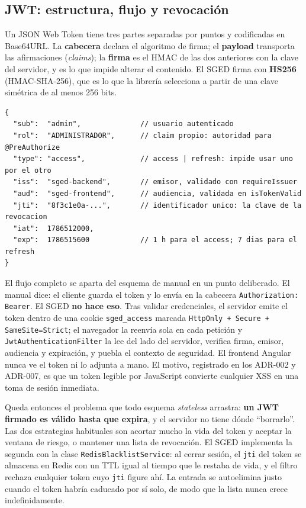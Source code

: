 \documentclass[12pt,a4paper]{article}
\begin{document}
\subsection{JWT: estructura, flujo y revocación}

Un JSON Web Token tiene tres partes separadas por puntos y codificadas en Base64URL. La
\textbf{cabecera} declara el algoritmo de firma; el \textbf{payload} transporta las
afirmaciones (\textit{claims}); la \textbf{firma} es el HMAC de las dos anteriores con la clave
del servidor, y es lo que impide alterar el contenido. El SGED firma con \textbf{HS256}
(HMAC-SHA-256), que es lo que la librería selecciona a partir de una clave simétrica de al menos
256 bits.

\begin{lstlisting}[style=json, caption={Payload real emitido por JwtService (valores de ejemplo)}]
{
  "sub":  "admin",              // usuario autenticado
  "rol":  "ADMINISTRADOR",      // claim propio: autoridad para @PreAuthorize
  "type": "access",             // access | refresh: impide usar uno por el otro
  "iss":  "sged-backend",       // emisor, validado con requireIssuer
  "aud":  "sged-frontend",      // audiencia, validada en isTokenValid
  "jti":  "8f3c1e0a-...",       // identificador unico: la clave de la revocacion
  "iat":  1786512000,
  "exp":  1786515600            // 1 h para el access; 7 dias para el refresh
}
\end{lstlisting}

El flujo completo se aparta del esquema de manual en un punto deliberado. El manual dice: el
cliente guarda el token y lo envía en la cabecera \texttt{Authorization: Bearer}. El SGED
\textbf{no hace eso}. Tras validar credenciales, el servidor emite el token dentro de una cookie
\texttt{sged\_access} marcada \texttt{HttpOnly + Secure + SameSite=Strict}; el navegador la
reenvía sola en cada petición y \texttt{JwtAuthenticationFilter} la lee del lado del servidor,
verifica firma, emisor, audiencia y expiración, y puebla el contexto de seguridad. El frontend
Angular nunca ve el token ni lo adjunta a mano. El motivo, registrado en los ADR-002 y ADR-007,
es que un token legible por JavaScript convierte cualquier XSS en una toma de sesión inmediata.

Queda entonces el problema que todo esquema \textit{stateless} arrastra: \textbf{un JWT firmado es
válido hasta que expira}, y el servidor no tiene dónde ``borrarlo''. Las dos estrategias
habituales son acortar mucho la vida del token y aceptar la ventana de riesgo, o mantener una
lista de revocación. El SGED implementa la segunda con la clase
\texttt{RedisBlacklistService}: al cerrar sesión, el \texttt{jti} del token se almacena en Redis
con un TTL igual al tiempo que le restaba de vida, y el filtro rechaza cualquier token cuyo
\texttt{jti} figure ahí. La entrada se autoelimina justo cuando el token habría caducado por sí
solo, de modo que la lista nunca crece indefinidamente.
\end{document}

